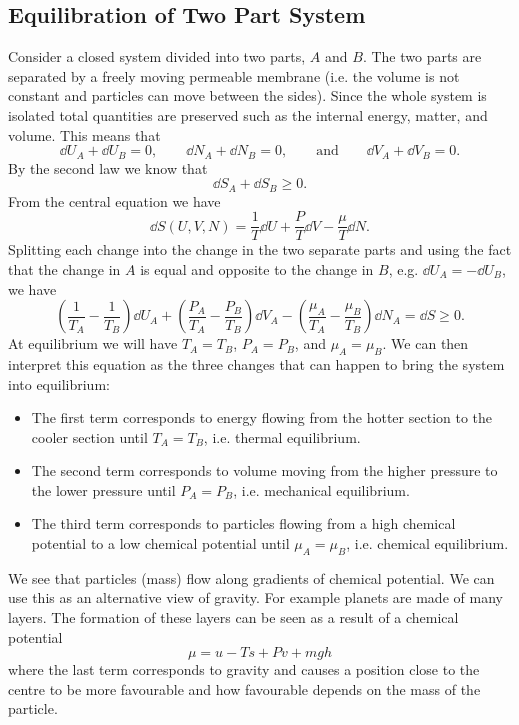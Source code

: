     \subsection{Equilibration of Two Part System}
    Consider a closed system divided into two parts, \(A\) and \(B\).
    The two parts are separated by a freely moving permeable membrane (i.e. the volume is not constant and particles can move between the sides).
    Since the whole system is isolated total quantities are preserved such as the internal energy, matter, and volume.
    This means that
    \[\dd{U_A} + \dd{U_B} = 0, \qquad\dd{N_A} + \dd{N_B} = 0, \qquad\text{and}\qquad \dd{V_A} + \dd{V_B} = 0.\]
    By the second law we know that
    \[\dd{S_A} + \dd{S_B} \ge 0.\]
    From the central equation we have
    \[\dd{S}(U, V, N) = \frac{1}{T}\dd{U} + \frac{P}{T}\dd{V} - \frac{\mu}{T}\dd{N}.\]
    Splitting each change into the change in the two separate parts and using the fact that the change in \(A\) is equal and opposite to the change in \(B\), e.g. \(\dd{U_A} = -\dd{U_B}\), we have
    \[\left(\frac{1}{T_A} - \frac{1}{T_B}\right)\dd{U_A} + \left(\frac{P_A}{T_A} - \frac{P_B}{T_B}\right)\dd{V_A} - \left(\frac{\mu_A}{T_A} - \frac{\mu_B}{T_B}\right)\dd{N_A} = \dd{S} \ge 0.\]
    At equilibrium we will have \(T_A = T_B\), \(P_A = P_B\), and \(\mu_A = \mu_B\).
    We can then interpret this equation as the three changes that can happen to bring the system into equilibrium:
    \begin{itemize}
        \item The first term corresponds to energy flowing from the hotter section to the cooler section until \(T_A = T_B\), i.e. thermal equilibrium.
        \item The second term corresponds to volume moving from the higher pressure to the lower pressure until \(P_A = P_B\), i.e. mechanical equilibrium.
        \item The third term corresponds to particles flowing from a high chemical potential to a low chemical potential until \(\mu_A = \mu_B\), i.e. chemical equilibrium.
    \end{itemize}
    We see that particles (mass) flow along gradients of chemical potential.
    We can use this as an alternative view of gravity.
    For example planets are made of many layers.
    The formation of these layers can be seen as a result of a chemical potential
    \[\mu = u - Ts + Pv + mgh\]
    where the last term corresponds to gravity and causes a position close to the centre to be more favourable and how favourable depends on the mass of the particle.
    
